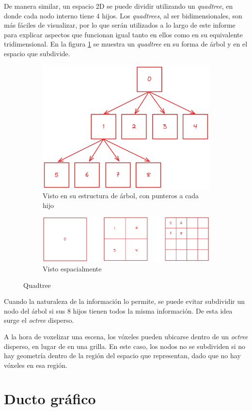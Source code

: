 De manera similar, un espacio 2D se puede dividir utilizando un \textit{quadtree}, en donde cada nodo interno tiene $4$ hijos.
Los \textit{quadtrees}, al ser bidimensionales, son más fáciles de visualizar, por lo que serán utilizados a lo largo de este informe para explicar aspectos que funcionan igual tanto en ellos como en su equivalente tridimensional.
En la figura \ref{fig:quadtree} se muestra un \textit{quadtree} en su forma de árbol y en el espacio que subdivide.

\begin{figure}
    \begin{subfigure}{\textwidth}
        \centering
        \includegraphics[width=.4\textwidth]{quadtree.png}
        \caption{Visto en su estructura de árbol, con punteros a cada hijo}
    \end{subfigure}
    \begin{subfigure}{\textwidth}
        \centering
        \includegraphics[width=.6\textwidth]{quadtree-spatial.png}
    \caption{Visto espacialmente}
    \end{subfigure}
    \caption{Quadtree}
    \label{fig:quadtree}
\end{figure}

Cuando la naturaleza de la información lo permite, se puede evitar subdividir un nodo del árbol si sus $8$ hijos tienen todos la misma información.
De esta idea surge el \textit{octree} disperso.

A la hora de voxelizar una escena, los vóxeles pueden ubicarse dentro de un \textit{octree} disperso, en lugar de en una grilla.
En este caso, los nodos no se subdividen si no hay geometría dentro de la región del espacio que representan, dado que no hay vóxeles en esa región.


\section{Ducto gráfico}\label{sec:graphics-pipeline}

